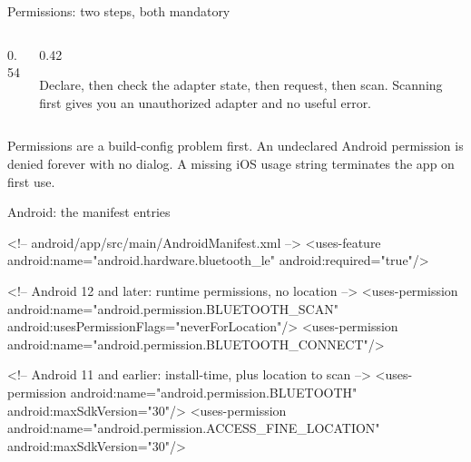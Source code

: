 \documentclass[10pt,aspectratio=169,t]{beamer}
\begin{document}
\begin{frame}[eyebrow=Permissions]{Permissions: two steps, both mandatory}
  \vskip 2mm
  \begin{columns}[T]
    \begin{column}{0.54\textwidth}
      \vskip 2mm
    \end{column}
    \begin{column}{0.42\textwidth}
      \begin{hint}
        Declare, then check the adapter state, then request, then scan. Scanning first gives you an unauthorized adapter and no useful error.
      \end{hint}
    \end{column}
  \end{columns}
  \begin{takeaway}{Permissions are a build-config problem first.}
    An undeclared Android permission is denied forever with no dialog. A missing iOS usage string terminates the app on first use.
  \end{takeaway}
\end{frame}

\begin{frame}[fragile,eyebrow=Permissions]{Android: the manifest entries}
\begin{codeblock}
<!-- android/app/src/main/AndroidManifest.xml -->
<uses-feature android:name="android.hardware.bluetooth_le"
              android:required="true"/>

<!-- Android 12 and later: runtime permissions, no location -->
<uses-permission android:name="android.permission.BLUETOOTH_SCAN"
                 android:usesPermissionFlags="neverForLocation"/>
<uses-permission android:name="android.permission.BLUETOOTH_CONNECT"/>

<!-- Android 11 and earlier: install-time, plus location to scan -->
<uses-permission android:name="android.permission.BLUETOOTH"
                 android:maxSdkVersion="30"/>
<uses-permission android:name="android.permission.ACCESS_FINE_LOCATION"
                 android:maxSdkVersion="30"/>
\end{codeblock}
\end{frame}
\end{document}
